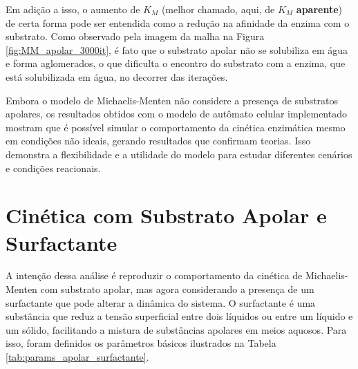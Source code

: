 \documentclass[12pt,oneside]{report}
\begin{document}
Em adição a isso, o aumento de $K_M$ (melhor chamado, aqui, de $K_M$ \textbf{aparente}) de certa forma pode ser entendida como a redução na afinidade da enzima com o substrato. Como observado pela imagem da malha na Figura \ref{fig:MM_apolar_3000it}, é fato que o substrato apolar não se solubiliza em água e forma aglomerados, o que dificulta o encontro do substrato com a enzima, que está solubilizada em água, no decorrer das iterações.

Embora o modelo de Michaelis-Menten não considere a presença de substratos apolares, os resultados obtidos com o modelo de autômato celular implementado mostram que é possível simular o comportamento da cinética enzimática mesmo em condições não ideais, gerando resultados que confirmam teorias. Isso demonstra a flexibilidade e a utilidade do modelo para estudar diferentes cenários e condições reacionais.

\section{Cinética com Substrato Apolar e Surfactante}

A intenção dessa análise é reproduzir o comportamento da cinética de Michaelis-Menten com substrato apolar, mas agora considerando a presença de um surfactante que pode alterar a dinâmica do sistema. O surfactante é uma substância que reduz a tensão superficial entre dois líquidos ou entre um líquido e um sólido, facilitando a mistura de substâncias apolares em meios aquosos. Para isso, foram definidos os parâmetros básicos ilustrados na Tabela \ref{tab:params_apolar_surfactante}.
\end{document}
